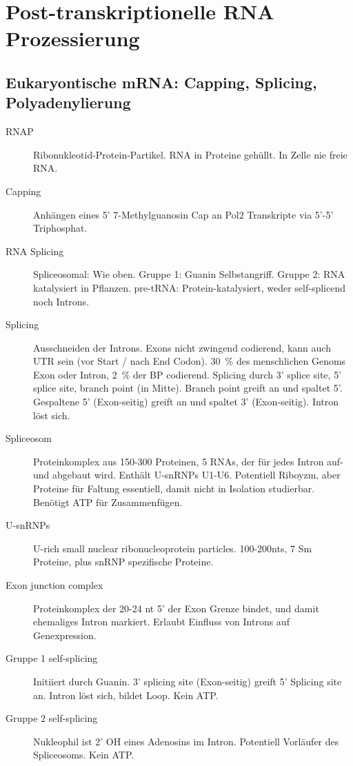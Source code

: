 \documentclass[a4paper,twocolumn,usegeometry,english,fontsize=6,DIV=16]{scrartcl}
\begin{document}
\section{Post-transkriptionelle RNA Prozessierung}

\subsection{Eukaryontische mRNA: Capping, Splicing, Polyadenylierung}

\begin{description}
	\item[RNAP] Ribonukleotid-Protein-Partikel. RNA in Proteine gehüllt. In Zelle nie freie RNA.
	\item[Capping] Anhängen eines 5' 7-Methylguanosin Cap an Pol2
		Transkripte via 5'-5' Triphosphat.
	\item[RNA Splicing] Spliceosomal: Wie oben. Gruppe 1: Guanin
		Selbstangriff. Gruppe 2: RNA katalysiert in Pflanzen. pre-tRNA:
		Protein-katalysiert, weder self-splicend noch Introns.
	\item[Splicing] Ausschneiden der Introns. Exons nicht zwingend
		codierend, kann auch UTR sein (vor Start / nach End Codon).
		\SI{30}{\percent} des menschlichen Genoms Exon oder Intron,
		\SI{2}{\percent} der BP codierend. Splicing durch 3' splice
		site, 5' splice site, branch point (in Mitte). Branch point
		greift an und spaltet 5'. Gespaltene 5' (Exon-seitig) greift an
		und spaltet 3' (Exon-seitig). Intron löst sich.
	\item[Spliceosom] Proteinkomplex aus 150-300 Proteinen, 5 RNAs, der für
		jedes Intron auf- und abgebaut wird. Enthält U-snRNPs U1-U6.
		Potentiell Riboyzm, aber Proteine für Faltung essentiell, damit
		nicht in Isolation studierbar. Benötigt ATP für Zusammenfügen.
	\item[U-snRNPs] U-rich small nuclear ribonucleoprotein particles.
		100-200nts, 7 Sm Proteine, plus snRNP spezifische Proteine.
	\item[Exon junction complex] Proteinkomplex der 20-24 nt 5' der Exon
		Grenze bindet, und damit ehemaliges Intron markiert. Erlaubt
		Einfluss von Introns auf Genexpression.
	\item[Gruppe 1 self-splicing] Initiiert durch Guanin. 3' splicing site
		(Exon-seitig) greift 5' Splicing site an. Intron löst sich,
		bildet Loop. Kein ATP.
	\item[Gruppe 2 self-splicing] Nukleophil ist 2' OH eines Adenosins im
		Intron. Potentiell Vorläufer des Spliceosoms. Kein ATP.

\end{description}
\end{document}
